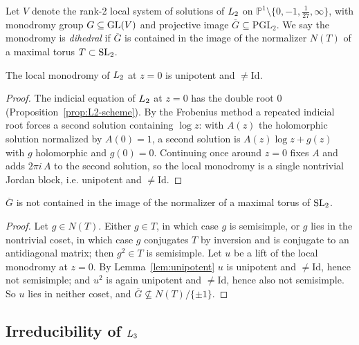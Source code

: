 Let $V$ denote the rank-2 local system of solutions of $L_2$ on
$\mathbb{P}^1 \setminus \{0,-1,\tfrac1{27},\infty\}$, with monodromy group
$G \subseteq \operatorname{GL}(V)$ and projective image $\overline{G} \subseteq \mathrm{PGL}_2$.
We say the monodromy is \emph{dihedral} if $\overline{G}$ is contained in the
image of the normalizer $N(T)$ of a maximal torus $T \subset \operatorname{SL}_2$.

\begin{lemma}
\label{lem:unipotent}
The local monodromy of $L_2$ at $z=0$ is unipotent and $\neq \mathrm{Id}$.
\end{lemma}

\begin{proof}
The indicial equation of $L_2$ at $z=0$ has the double root $0$
(Proposition~\ref{prop:L2-scheme}). By the Frobenius method a repeated
indicial root forces a second solution containing $\log z$: with $A(z)$ the
holomorphic solution normalized by $A(0)=1$, a second solution is
$A(z)\log z + g(z)$ with $g$ holomorphic and $g(0)=0$. Continuing once around
$z=0$ fixes $A$ and adds $2\pi i\,A$ to the second solution, so the local
monodromy is a single nontrivial Jordan block, i.e. unipotent and
$\neq\mathrm{Id}$.
\end{proof}

\begin{lemma}\label{lem:not-dihedral}
$\overline{G}$ is not contained in the image of the normalizer of a maximal
torus of $\operatorname{SL}_2$.
\end{lemma}

\begin{proof}
Let $g \in N(T)$. Either $g \in T$, in which case $g$ is semisimple, or $g$
lies in the nontrivial coset, in which case $g$ conjugates $T$ by inversion
and is conjugate to an antidiagonal matrix; then $g^2 \in T$ is semisimple. Let
$u$ be a lift of the local monodromy at $z=0$. By
Lemma~\ref{lem:unipotent} $u$ is unipotent and $\neq\mathrm{Id}$, hence not
semisimple; and $u^2$ is again unipotent and $\neq\mathrm{Id}$, hence also not
semisimple. So $u$ lies in neither coset, and $\overline{G}\not\subseteq
N(T)/\{\pm 1\}$.
\end{proof}

\subsection{Irreducibility of \texorpdfstring{$L_3$}{L3}}

